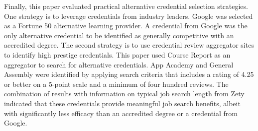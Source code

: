 \documentclass[review]{elsarticle}
\begin{document}

Finally, this paper evaluated practical alternative credential selection strategies.
One strategy is to leverage credentials from industry leaders.
Google was selected as a Fortune 50 alternative learning provider.
A credential from Google was the only alternative credential to be identified as generally competitive with an accredited degree.
The second strategy is to use credential review aggregator sites to identify high prestige credentials.
This paper used Course Report as an aggregator to search for alternative credentials.
App Academy and General Assembly were identified by applying search criteria that includes a rating of 4.25 or better on a 5-point scale and a minimum of four hundred reviews.
The combination of results with information on typical job search length from Zety indicated
that these credentials provide meaningful job search benefits,
albeit with significantly less efficacy than an accredited degree or a credential from Google.



\end{document}
